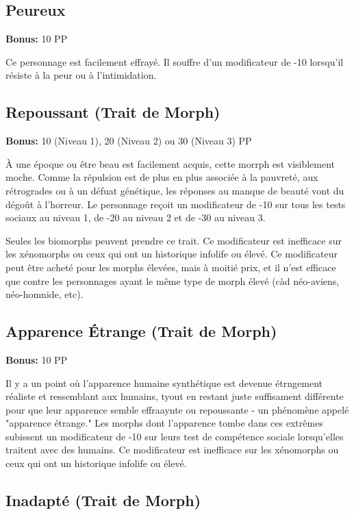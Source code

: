 \subsection{Peureux} \label{sec:traits-timid} 

\textbf{Bonus:} 10 PP 

Ce personnage est facilement effrayé. Il souffre d'un modificateur de -10 lorsqu'il résiste à la peur ou à l'intimidation. 

\subsection{Repoussant (Trait de Morph)} \label{sec:traits-unattractive} 

\textbf{Bonus:} 10 (Niveau 1), 20 (Niveau 2) ou 30 (Niveau 3) PP 

À une époque ou être beau est facilement acquis, cette morrph est visiblement moche. Comme la répulsion est de plus en plus associée à la pauvreté, aux rétrogrades ou à un défuat génétique, les réponses au manque de beauté vont du dégoût à l'horreur. Le personnage reçoit un modificateur de -10 sur tous les tests sociaux au niveau 1, de -20 au niveau 2 et de -30 au niveau 3. 

Seules les biomorphs peuvent prendre ce trait. Ce modificateur est inefficace sur les xénomorphs ou ceux qui ont un historique infolife ou élevé. Ce modificateur peut être acheté pour les morphs élevées, mais à moitié prix, et il n'est efficace que contre les personnages ayant le même type de morph élevé (càd néo-aviens, néo-homnide, etc). 

\subsection{Apparence Étrange (Trait de Morph)} \label{sec:traits-uncanny-valley} 

\textbf{Bonus:} 10 PP 

Il y a un point où l'apparence humaine synthétique est devenue étrngement réaliste et ressemblant aux humains, tyout en restant juste suffisament différente pour que leur apparence semble effraaynte ou repoussante - un phénomène appelé "apparence étrange." Les morphs dont l'apparence tombe dans ces extrêmes subissent un modificateur de -10 sur leurs test de compétence sociale lorsqu'elles traitent avec des humains. Ce modificateur est inefficace sur les xénomorphs ou ceux qui ont un historique infolife ou élevé. 

\subsection{Inadapté (Trait de Morph)} \label{sec:traits-unfit} 

